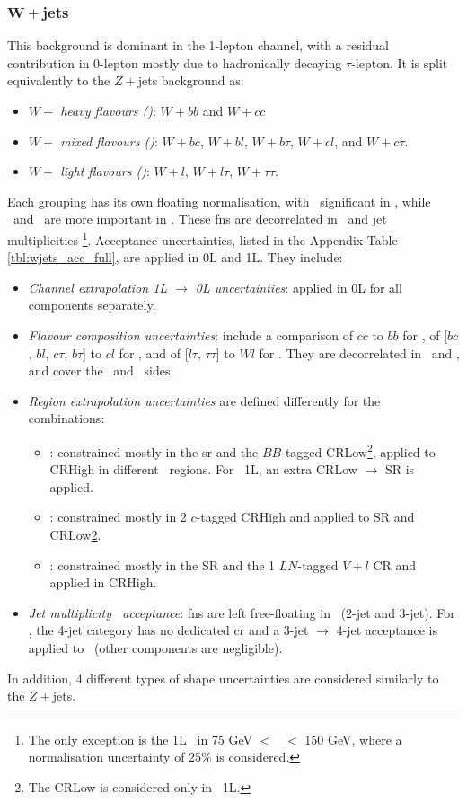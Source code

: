 \subsubsection{$\boldsymbol{W+}$jets}
This background is dominant in the 1-lepton channel, with a residual contribution in 0-lepton mostly due to hadronically decaying $\tau$-lepton. It is split equivalently to the $Z+$jets background as:   
\begin{itemize}
    \item \textit{$W+$ heavy flavours (\whf)}: $W+bb$ and $W+cc$
    \item \textit{$W+$ mixed flavours (\wmf)}: $W+bc$, $W+bl$, $W+b\tau$, $W+cl$, and $W+c\tau$.
    \item \textit{$W+$ light flavours (\wlf)}: $W+l$, $W+l\tau$, $W+\tau\tau$.
\end{itemize}
Each grouping has its own floating normalisation, with \whf\ significant in \vhb, while \wmf\ and \wlf\ are more important in \vhc. These \gls{fn}s are decorrelated in \ptv\ and jet multiplicities \nj\footnote{The only exception is the 1L \wlf\ in 75 GeV $<$ \ptv\ $<$ 150 GeV, where a normalisation uncertainty of 25\% is considered.}. Acceptance uncertainties, listed in the Appendix Table \ref{tbl:wjets_acc_full}, are applied in 0L and 1L. They include:
\begin{itemize}[leftmargin=*]
    \item \textit{Channel extrapolation 1L $\rightarrow$ 0L uncertainties}: applied in 0L for all components separately. 
    \item \textit{Flavour composition uncertainties}: include a comparison of $cc$ to $bb$ for \whf, of [$bc$, $bl$, $c\tau$, $b\tau$] to $cl$ for \wmf, and of [$l\tau$, $\tau\tau$] to $Wl$ for \wlf. They are decorrelated in \ptv\ and \nj, and cover the \vhb\ and \vhc\ sides. 
    \item \textit{Region extrapolation uncertainties} are defined differently for the combinations:
    \begin{itemize}
        \item \whf: constrained mostly in the \gls{sr} and the $BB$-tagged CRLow\footnote{\label{footnote-crlow}The CRLow is considered only in \vhb\ 1L.}, applied to CRHigh in different \ptv\ regions. For \vhb\ 1L, an extra CRLow $\rightarrow$ SR is applied. 
        \item \wmf: constrained mostly in 2 $c$-tagged CRHigh and applied to SR and CRLow\cref{footnote-crlow}.
        \item \wlf: constrained mostly in the SR and the 1 $LN$-tagged $V+l$ CR and applied in CRHigh. %
    \end{itemize}
    \item \textit{Jet multiplicity \nj\ acceptance}: \gls{fn}s are left free-floating in \nj\ (2-jet and 3-jet). For \vhb, the 4-jet category has no dedicated \gls{cr} and a 3-jet $\rightarrow$ 4-jet acceptance is applied to \whf\ (other components are negligible).
\end{itemize}
In addition, 4 different types of shape uncertainties are considered similarly to the $Z+$jets.

